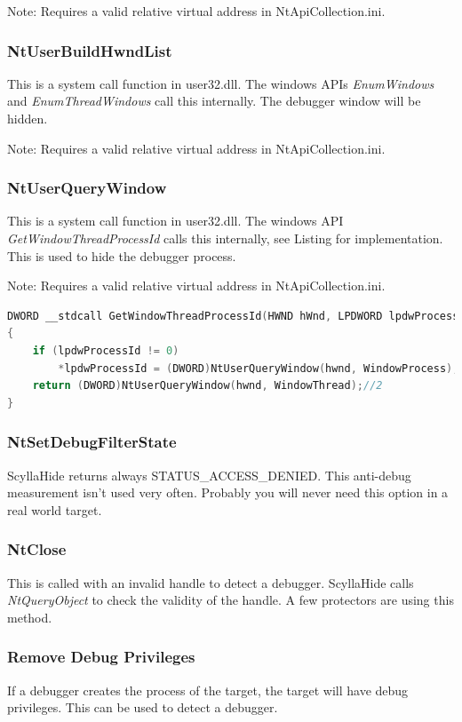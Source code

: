 \documentclass[10pt,a4paper]{article}
\begin{document}
Note: Requires a valid relative virtual address in NtApiCollection.ini.

\subsubsection{NtUserBuildHwndList}
This is a system call function in user32.dll. The windows APIs \textit{EnumWindows} and \textit{EnumThreadWindows} call this internally. The debugger window will be hidden.

Note: Requires a valid relative virtual address in NtApiCollection.ini.

\subsubsection{NtUserQueryWindow}
This is a system call function in user32.dll. The windows API \textit{GetWindowThreadProcessId} calls this internally, see Listing for implementation. This is used to hide the debugger process.

Note: Requires a valid relative virtual address in NtApiCollection.ini.

\begin{lstlisting}[language=C, caption=GetWindowThreadProcessId Implementation]
DWORD __stdcall GetWindowThreadProcessId(HWND hWnd, LPDWORD lpdwProcessId)
{
	if (lpdwProcessId != 0)
		*lpdwProcessId = (DWORD)NtUserQueryWindow(hwnd, WindowProcess);//0
	return (DWORD)NtUserQueryWindow(hwnd, WindowThread);//2
}
\end{lstlisting}

\subsubsection{NtSetDebugFilterState}
ScyllaHide returns always STATUS\_ACCESS\_DENIED. This anti-debug measurement isn't used very often. Probably you will never need this option in a real world target.

\subsubsection{NtClose}
This is called with an invalid handle to detect a debugger. ScyllaHide calls \textit{NtQueryObject} to check the validity of the handle. A few protectors are using this method.

\subsubsection{Remove Debug Privileges}
If a debugger creates the process of the target, the target will have debug privileges. This can be used to detect a debugger.
\end{document}
